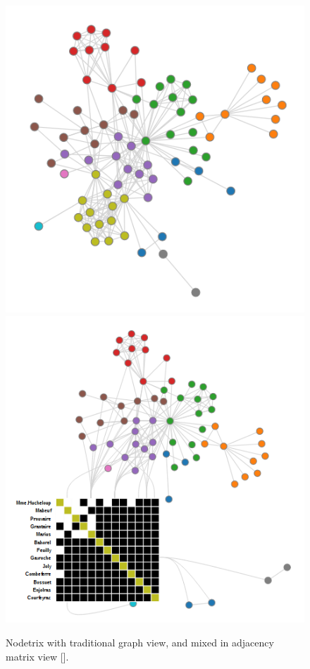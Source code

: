 \begin{figure}[h]
\centering
\includegraphics[width=\textwidth/3]{images/nodetrix_matrix}
\includegraphics[width=\textwidth/3]{images/nodetrix_cluster}
\caption{Nodetrix with traditional graph view, and mixed in adjacency matrix view [\cite{henry-nodetrix-2007}]. \label{fig:nodetrix_cluster}}
\end{figure}
